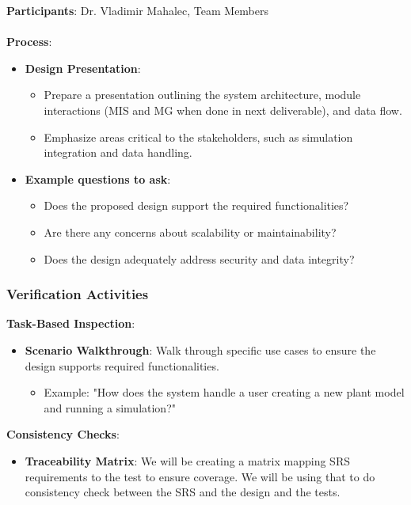 \documentclass[12pt, titlepage]{article}
\begin{document}
\textbf{Participants}: Dr. Vladimir Mahalec, Team Members
\\\\
\textbf{Process}:
\begin{itemize}
    \item \textbf{Design Presentation}:
    \begin{itemize}
        \item Prepare a presentation outlining the system architecture, module interactions (MIS and MG when done in next deliverable), and data flow.
        \item Emphasize areas critical to the stakeholders, such as simulation integration and data handling.
    \end{itemize}
    \item \textbf{Example questions to ask}:
      \begin{itemize}
          \item Does the proposed design support the required functionalities?
          \item Are there any concerns about scalability or maintainability?
          \item Does the design adequately address security and data integrity?
      \end{itemize}
\end{itemize}

\subsubsection{Verification Activities}

\textbf{Task-Based Inspection}:
\begin{itemize}
    \item \textbf{Scenario Walkthrough}: Walk through specific use cases to ensure the design supports required functionalities.
    \begin{itemize}
        \item Example: "How does the system handle a user creating a new plant model and running a simulation?"
    \end{itemize}
\end{itemize}

\textbf{Consistency Checks}:
\begin{itemize}
    \item \textbf{Traceability Matrix}: We will be creating a matrix mapping SRS requirements to the test to ensure coverage. We will be using that to do consistency check between the SRS and the design and the tests. 
\end{itemize}
\end{document}
